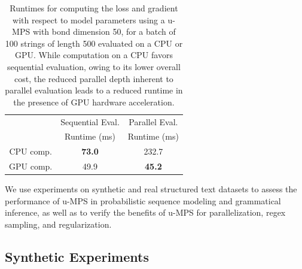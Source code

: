 \documentclass[twoside]{article}
\begin{document}
\begin{table}[t]
\begin{center}
\begin{small}
\begin{sc}
\begin{tabular}{lc|cccc}
\end{tabular}
\end{sc}
\end{small}
\end{center}
\vskip -0.1in
\end{table}
%
\begin{table}[t]
\caption{Runtimes for computing the loss and gradient with respect to model parameters using a u-MPS with bond dimension 50, for a batch of 100 strings of length 500 evaluated on a CPU or GPU. While computation on a CPU favors sequential evaluation, owing to its lower overall cost, the reduced parallel depth inherent to parallel evaluation leads to a reduced runtime in the presence of GPU hardware acceleration.}
\label{tab:runtime}
\renewcommand{\arraystretch}{1.1}
\begin{center}
\begin{small}
\begin{sc}
\begin{tabular}{c|cc}
          & Sequential Eval. & Parallel Eval.   \\
          & Runtime (ms)     & Runtime (ms) \\
\hline
CPU comp. & \textbf{73.0}    & 232.7 \\
GPU comp. & 49.9             & \textbf{45.2}  \\
\end{tabular}
\end{sc}
\end{small}
\end{center}
\vskip -0.1in
\end{table}

We use experiments on synthetic and real structured text datasets to assess the performance of u-MPS in probabilistic sequence modeling and grammatical inference, as well as to verify the benefits of u-MPS for parallelization, regex sampling, and regularization. 

\subsection{Synthetic Experiments}
\end{document}
